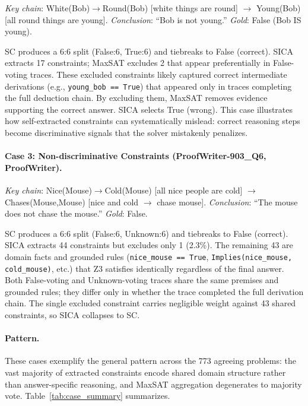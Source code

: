 \emph{Key chain}: White(Bob)$\to$Round(Bob) [white things are round] $\to$ Young(Bob) [all round things are young]. \emph{Conclusion}: ``Bob is not young.'' \emph{Gold}: False (Bob IS young).

SC produces a 6:6 split (False:6, True:6) and tiebreaks to False (correct). SICA extracts 17 constraints; MaxSAT excludes 2 that appear preferentially in False-voting traces. These excluded constraints likely captured correct intermediate derivations (e.g., \texttt{young\_bob == True}) that appeared only in traces completing the full deduction chain. By excluding them, MaxSAT removes evidence supporting the correct answer. SICA selects True (wrong). This case illustrates how self-extracted constraints can systematically mislead: correct reasoning steps become discriminative signals that the solver mistakenly penalizes.

\paragraph{Case 3: Non-discriminative Constraints (ProofWriter-903\_Q6, ProofWriter).}

\emph{Key chain}: Nice(Mouse)$\to$Cold(Mouse) [all nice people are cold] $\to$ Chases(Mouse,Mouse) [nice and cold $\to$ chase mouse]. \emph{Conclusion}: ``The mouse does not chase the mouse.'' \emph{Gold}: False.

SC produces a 6:6 split (False:6, Unknown:6) and tiebreaks to False (correct). SICA extracts 44 constraints but excludes only 1 (2.3\%). The remaining 43 are domain facts and grounded rules (\texttt{nice\_mouse == True}, \texttt{Implies(nice\_mouse, cold\_mouse)}, etc.) that Z3 satisfies identically regardless of the final answer. Both False-voting and Unknown-voting traces share the same premises and grounded rules; they differ only in whether the trace completed the full derivation chain. The single excluded constraint carries negligible weight against 43 shared constraints, so SICA collapses to SC.

\paragraph{Pattern.}

These cases exemplify the general pattern across the 773 agreeing problems: the vast majority of extracted constraints encode shared domain structure rather than answer-specific reasoning, and MaxSAT aggregation degenerates to majority vote. Table~\ref{tab:case_summary} summarizes.

